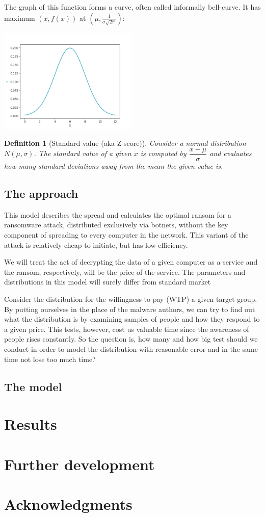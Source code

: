 \documentclass[11pt, a4paper]{article}
\newtheorem{definition}{Definition}
\begin{document}
			The graph of this function forms a curve, often called informally bell-curve. It has maximum $(x,f(x))$ at $(\mu, \frac{1}{\sigma\sqrt{2\pi}})$:
			\begin{center}
			\includegraphics[width=0.5\textwidth]{Graphics/Normal_clean}
			\end{center}
		
		\begin{definition}[Standard value (aka Z-score)] Consider a normal distribution $N(\mu, \sigma)$. The standard value of a given $x$ is computed by $\dfrac{x-\mu}{\sigma}$ and evaluates how many standard deviations away from the mean the given value is.
			
		\end{definition}
	\subsection{The approach}
		This model describes the spread and calculates the optimal ransom for a ransomware attack, distributed exclusively via botnets, without the key component of spreading to every computer in the network. This variant of the attack is relatively cheap to initiate, but has low efficiency.\par
		We will treat the act of decrypting the data of a given computer as a service and the ransom, respectively, will be the price of the service. The parameters and distributions in this model will surely differ from standard market\par
		Consider the distribution for the willingness to pay (WTP) a given target group. By putting ourselves in the place of the malware authors, we can try to find out what the distribution is by examining samples of people and how they respond to a given price. This tests, however, cost us valuable time since the awareness of people rises constantly. So the question is, how many and how big test should we conduct in order to model the distribution with reasonable error and in the same time not lose too much time?
	\subsection{The model}
\section{Results}
\section{Further development}
\section*{Acknowledgments}
\nocite{*}


\end{document}
